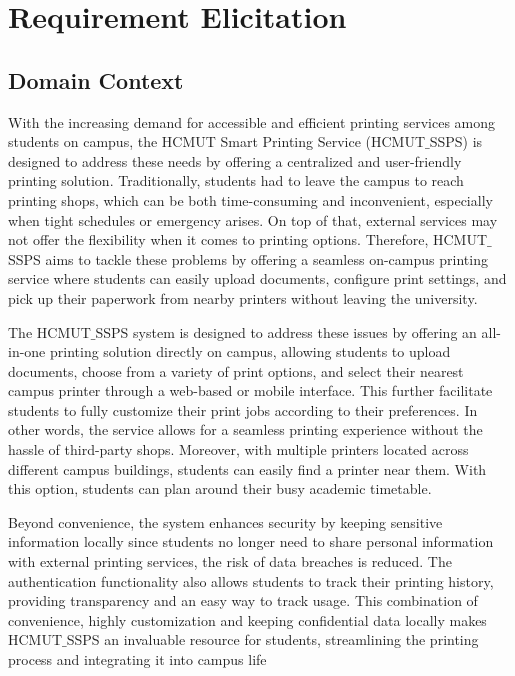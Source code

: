 \chapter{Requirement Elicitation}

\section{Domain Context}
With the increasing demand for accessible and efficient printing services among students on campus, the HCMUT Smart Printing Service (HCMUT$\_$SSPS) is designed to address these needs by offering a centralized and user-friendly printing solution. Traditionally, students had to leave the campus to reach printing shops, which can be both time-consuming and inconvenient, especially when tight schedules or emergency arises. On top of that, external services may not offer the flexibility when it comes to printing options. Therefore, HCMUT$\_$SSPS aims to tackle these problems by offering a seamless on-campus printing service where students can easily upload documents, configure print settings, and pick up their paperwork from nearby printers without leaving the university.

The HCMUT$\_$SSPS system is designed to address these issues by offering an all-in-one printing solution directly on campus, allowing students to upload documents, choose from a variety of print options, and select their nearest campus printer through a web-based or mobile interface. This further facilitate students to fully customize their print jobs according to their preferences. In other words, the service allows for a seamless printing experience without the hassle of third-party shops. Moreover, with multiple printers located across different campus buildings, students can easily find a printer near them. With this option, students can plan around their busy academic timetable.

Beyond convenience, the system enhances security by keeping sensitive information locally since students no longer need to share personal information with external printing services, the risk of data breaches is reduced. The authentication functionality also allows students to track their printing history, providing transparency and an easy way to track usage. This combination of convenience, highly customization and keeping confidential data locally makes HCMUT$\_$SSPS an invaluable resource for students, streamlining the printing process and integrating it into campus life

